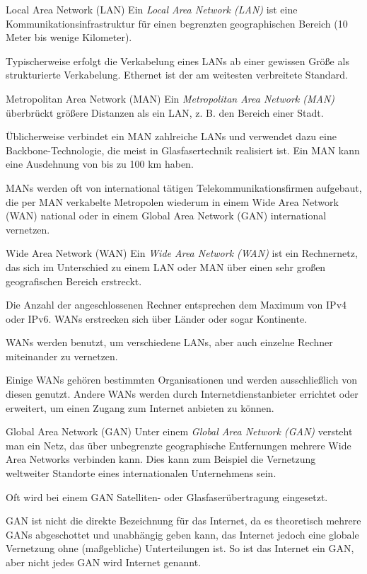 \begin{defi}{Local Area Network (LAN)}
    Ein \emph{Local Area Network (LAN)} ist eine Kommunikationsinfrastruktur für einen begrenzten geographischen Bereich (10 Meter bis wenige Kilometer).

    Typischerweise erfolgt die Verkabelung eines LANs ab einer gewissen Größe als strukturierte Verkabelung.
    Ethernet ist der am weitesten verbreitete Standard.
\end{defi}

\begin{defi}{Metropolitan Area Network (MAN)}
    Ein \emph{Metropolitan Area Network (MAN)} überbrückt größere Distanzen als ein LAN, z. B. den Bereich einer Stadt.

    Üblicherweise verbindet ein MAN zahlreiche LANs und verwendet dazu eine Backbone-Technologie, die meist in Glasfasertechnik realisiert ist.
    Ein MAN kann eine Ausdehnung von bis zu 100 km haben.

    MANs werden oft von international tätigen Telekommunikationsfirmen aufgebaut, die per MAN verkabelte Metropolen wiederum in einem Wide Area Network (WAN) national oder in einem Global Area Network (GAN) international vernetzen.
\end{defi}

\begin{defi}{Wide Area Network (WAN)}
    Ein \emph{Wide Area Network (WAN)} ist ein Rechnernetz, das sich im Unterschied zu einem LAN oder MAN über einen sehr großen geografischen Bereich erstreckt.

    Die Anzahl der angeschlossenen Rechner entsprechen dem Maximum von IPv4 oder IPv6.
    WANs erstrecken sich über Länder oder sogar Kontinente.

    WANs werden benutzt, um verschiedene LANs, aber auch einzelne Rechner miteinander zu vernetzen.

    Einige WANs gehören bestimmten Organisationen und werden ausschließlich von diesen genutzt.
    Andere WANs werden durch Internetdienstanbieter errichtet oder erweitert, um einen Zugang zum Internet anbieten zu können.
\end{defi}

\begin{defi}{Global Area Network (GAN)}
    Unter einem \emph{Global Area Network (GAN)} versteht man ein Netz, das über unbegrenzte geographische Entfernungen mehrere Wide Area Networks verbinden kann.
    Dies kann zum Beispiel die Vernetzung weltweiter Standorte eines internationalen Unternehmens sein.

    Oft wird bei einem GAN Satelliten- oder Glasfaserübertragung eingesetzt.

    GAN ist nicht die direkte Bezeichnung für das Internet, da es theoretisch mehrere GANs abgeschottet und unabhängig geben kann, das Internet jedoch eine globale Vernetzung ohne (maßgebliche) Unterteilungen ist.
    So ist das Internet ein GAN, aber nicht jedes GAN wird Internet genannt.
\end{defi}

